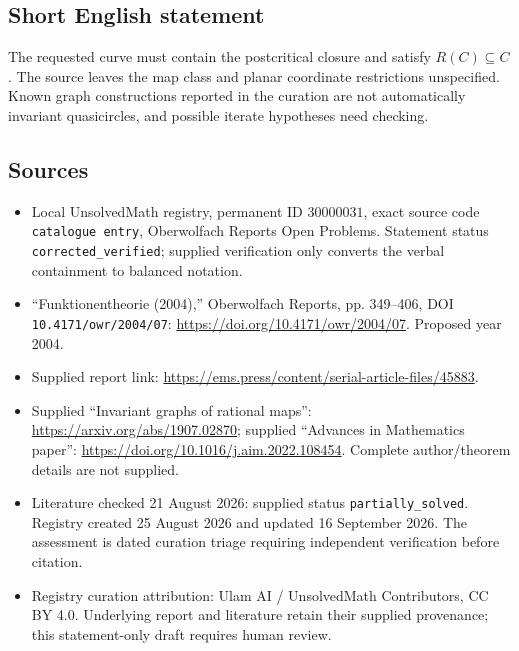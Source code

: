 \documentclass[11pt]{article}
\begin{document}
\subsection{Short English statement}
The requested curve must contain the postcritical closure and satisfy \(R(C)\subseteq C\). The source leaves the map class and planar coordinate restrictions unspecified. Known graph constructions reported in the curation are not automatically invariant quasicircles, and possible iterate hypotheses need checking.
\subsection{Sources}
\begin{itemize}
\item Local UnsolvedMath registry, permanent ID \(30000031\), exact source code \texttt{catalogue entry}, Oberwolfach Reports Open Problems. Statement status \texttt{corrected\_verified}; supplied verification only converts the verbal containment to balanced notation.
\item ``Funktionentheorie (2004),'' Oberwolfach Reports, pp. 349--406, DOI \texttt{10.4171/owr/2004/07}: \url{https://doi.org/10.4171/owr/2004/07}. Proposed year 2004.
\item Supplied report link: \url{https://ems.press/content/serial-article-files/45883}.
\item Supplied ``Invariant graphs of rational maps'': \url{https://arxiv.org/abs/1907.02870}; supplied ``Advances in Mathematics paper'': \url{https://doi.org/10.1016/j.aim.2022.108454}. Complete author/theorem details are not supplied.
\item Literature checked 21 August 2026: supplied status \texttt{partially\_solved}. Registry created 25 August 2026 and updated 16 September 2026. The assessment is dated curation triage requiring independent verification before citation.
\item Registry curation attribution: Ulam AI / UnsolvedMath Contributors, CC BY 4.0. Underlying report and literature retain their supplied provenance; this statement-only draft requires human review.
\end{itemize}
\end{document}
